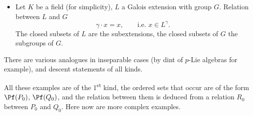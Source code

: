 
\begin{itemize}[leftmargin=2.5em]
\item[5)] Let $K$ be a field (for simplicity), $L$ a Galois extension with group $G$. Relation between $L$ and $G$
\[
\gamma\cdot x=x,\qquad \text{i.e. } x\in L^{\gamma}.
\]
The closed subsets of $L$ are the subextensions, the closed subsets of $G$ the subgroups of $G$.
\end{itemize}

There are various analogues in inseparable cases (by dint of $p$-Lie algebras for example), and descent statements of all kinds.

All these examples are of the 1\textsuperscript{st} kind, the ordered sets that occur are of the form $\Pf(P_0)$, $\Pf(Q_0)$, and the relation between them is deduced from a relation $R_0$ between $P_0$ and $Q_0$. Here now are more complex examples.

